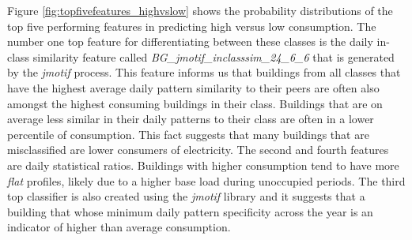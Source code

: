 Figure \ref{fig:topfivefeatures_highvslow} shows the probability distributions of the top five performing features in predicting high versus low consumption. The number one top feature for differentiating between these classes is the daily in-class similarity feature called \emph{BG\_jmotif\_inclasssim\_24\_6\_6} that is generated by the \emph{jmotif} process. This feature informs us that buildings from all classes that have the highest average daily pattern similarity to their peers are often also amongst the highest consuming buildings in their class. Buildings that are on average less similar in their daily patterns to their class are often in a lower percentile of consumption. This fact suggests that many buildings that are misclassified are lower consumers of electricity. The second and fourth features are daily statistical ratios. Buildings with higher consumption tend to have more \emph{flat} profiles, likely due to a higher base load during unoccupied periods. The third top classifier is also created using the \emph{jmotif} library and it suggests that a building that whose minimum daily pattern specificity across the year is an indicator of higher than average consumption. 